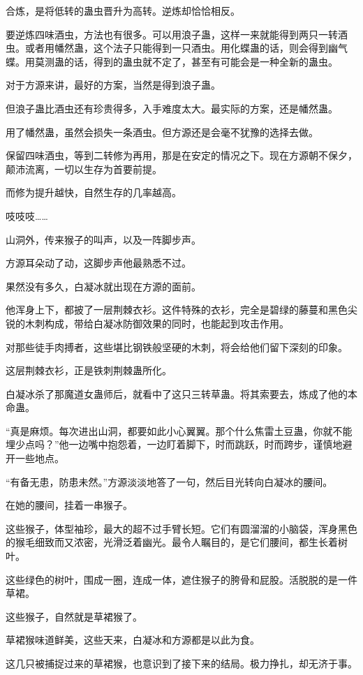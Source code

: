 \begin{this_body}
合炼，是将低转的蛊虫晋升为高转。逆炼却恰恰相反。

要逆炼四味酒虫，方法也有很多。可以用浪子蛊，这样一来就能得到两只一转酒虫。或者用幡然蛊，这个法子只能得到一只酒虫。用化蝶蛊的话，则会得到幽气蝶。用莫测蛊的话，得到的蛊虫就不定了，甚至有可能会是一种全新的蛊虫。

对于方源来讲，最好的方案，当然是得到浪子蛊。

但浪子蛊比酒虫还有珍贵得多，入手难度太大。最实际的方案，还是幡然蛊。

用了幡然蛊，虽然会损失一条酒虫。但方源还是会毫不犹豫的选择去做。

保留四味酒虫，等到二转修为再用，那是在安定的情况之下。现在方源朝不保夕，颠沛流离，一切以生存为首要前提。

而修为提升越快，自然生存的几率越高。

吱吱吱……

山洞外，传来猴子的叫声，以及一阵脚步声。

方源耳朵动了动，这脚步声他最熟悉不过。

果然没有多久，白凝冰就出现在方源的面前。

他浑身上下，都披了一层荆棘衣衫。这件特殊的衣衫，完全是碧绿的藤蔓和黑色尖锐的木刺构成，带给白凝冰防御效果的同时，也能起到攻击作用。

对那些徒手肉搏者，这些堪比钢铁般坚硬的木刺，将会给他们留下深刻的印象。

这层荆棘衣衫，正是铁刺荆棘蛊所化。

白凝冰杀了那魔道女蛊师后，就看中了这只三转草蛊。将其索要去，炼成了他的本命蛊。

“真是麻烦。每次进出山洞，都要如此小心翼翼。那个什么焦雷土豆蛊，你就不能埋少点吗？”他一边嘴中抱怨着，一边盯着脚下，时而跳跃，时而跨步，谨慎地避开一些地点。

“有备无患，防患未然。”方源淡淡地答了一句，然后目光转向白凝冰的腰间。

在她的腰间，挂着一串猴子。

这些猴子，体型袖珍，最大的超不过手臂长短。它们有圆溜溜的小脑袋，浑身黑色的猴毛细致而又浓密，光滑泛着幽光。最令人瞩目的，是它们腰间，都生长着树叶。

这些绿色的树叶，围成一圈，连成一体，遮住猴子的胯骨和屁股。活脱脱的是一件草裙。

这些猴子，自然就是草裙猴了。

草裙猴味道鲜美，这些天来，白凝冰和方源都是以此为食。

这几只被捕捉过来的草裙猴，也意识到了接下来的结局。极力挣扎，却无济于事。


\end{this_body}
